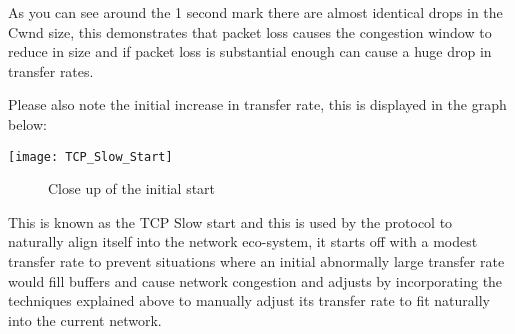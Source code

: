 As you can see around the 1 second mark there are almost identical drops in the Cwnd size, this demonstrates that packet loss causes the congestion window to reduce in size and if packet loss is substantial enough can cause a huge drop in transfer rates.

Please also note the initial increase in transfer rate, this is displayed in the graph below:

\begin{center}
	\texttt{[image: TCP\_Slow\_Start]}
	\begin{figure}[h]
	 	\caption{Close up of the initial start}
	\end{figure}		
\end{center}

This is known as the TCP Slow start and this is used by the protocol to naturally align itself into the network eco-system, it starts off with a modest transfer rate to prevent situations where an initial abnormally large transfer rate would fill buffers and cause network congestion and adjusts by incorporating the techniques explained above to manually adjust its transfer rate to fit naturally into the current network.
 